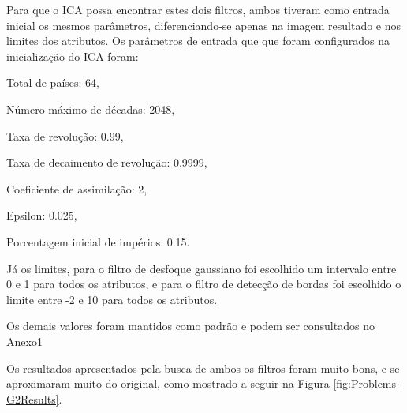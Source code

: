 Para que o ICA possa encontrar estes dois filtros, ambos tiveram como entrada inicial os mesmos parâmetros, diferenciando-se apenas na imagem resultado e nos limites dos atributos. Os parâmetros de entrada que que foram configurados na inicialização do ICA foram:

Total de países: 64, 

Número máximo de décadas: 2048, 

Taxa de revolução: 0.99, 

Taxa de decaimento de revolução: 0.9999, 

Coeficiente de assimilação: 2, 

Epsilon: 0.025, 

Porcentagem inicial de impérios: 0.15. 

Já os limites, para o filtro de desfoque gaussiano foi escolhido um intervalo entre 0 e 1 para todos os atributos, e para o filtro de detecção de bordas foi escolhido o limite entre -2 e 10 para todos os atributos.

Os demais valores foram mantidos como padrão e podem ser consultados no Anexo1

Os resultados apresentados pela busca de ambos os filtros foram muito bons, e se aproximaram muito do original, como mostrado a seguir na Figura \ref{fig:Problems-G2Results}.

